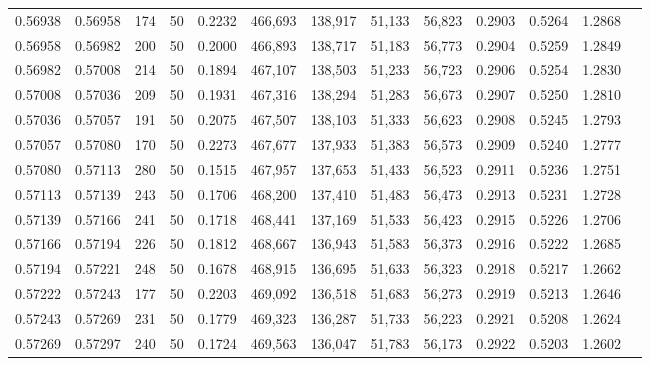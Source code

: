 \begin{tabular}{rrrrrrrrrrrrr}
0.56938 & 0.56958 &   174 &  50 &                                     0.2232 & 466,693 & 138,917 &  51,133 &  56,823 & 0.2903 & 0.5264 & 1.2868 \\
0.56958 & 0.56982 &   200 &  50 &                                     0.2000 & 466,893 & 138,717 &  51,183 &  56,773 & 0.2904 & 0.5259 & 1.2849 \\
0.56982 & 0.57008 &   214 &  50 &                                     0.1894 & 467,107 & 138,503 &  51,233 &  56,723 & 0.2906 & 0.5254 & 1.2830 \\
0.57008 & 0.57036 &   209 &  50 &                                     0.1931 & 467,316 & 138,294 &  51,283 &  56,673 & 0.2907 & 0.5250 & 1.2810 \\
0.57036 & 0.57057 &   191 &  50 &                                     0.2075 & 467,507 & 138,103 &  51,333 &  56,623 & 0.2908 & 0.5245 & 1.2793 \\
0.57057 & 0.57080 &   170 &  50 &                                     0.2273 & 467,677 & 137,933 &  51,383 &  56,573 & 0.2909 & 0.5240 & 1.2777 \\
0.57080 & 0.57113 &   280 &  50 &                                     0.1515 & 467,957 & 137,653 &  51,433 &  56,523 & 0.2911 & 0.5236 & 1.2751 \\
0.57113 & 0.57139 &   243 &  50 &                                     0.1706 & 468,200 & 137,410 &  51,483 &  56,473 & 0.2913 & 0.5231 & 1.2728 \\
0.57139 & 0.57166 &   241 &  50 &                                     0.1718 & 468,441 & 137,169 &  51,533 &  56,423 & 0.2915 & 0.5226 & 1.2706 \\
0.57166 & 0.57194 &   226 &  50 &                                     0.1812 & 468,667 & 136,943 &  51,583 &  56,373 & 0.2916 & 0.5222 & 1.2685 \\
0.57194 & 0.57221 &   248 &  50 &                                     0.1678 & 468,915 & 136,695 &  51,633 &  56,323 & 0.2918 & 0.5217 & 1.2662 \\
0.57222 & 0.57243 &   177 &  50 &                                     0.2203 & 469,092 & 136,518 &  51,683 &  56,273 & 0.2919 & 0.5213 & 1.2646 \\
0.57243 & 0.57269 &   231 &  50 &                                     0.1779 & 469,323 & 136,287 &  51,733 &  56,223 & 0.2921 & 0.5208 & 1.2624 \\
0.57269 & 0.57297 &   240 &  50 &                                     0.1724 & 469,563 & 136,047 &  51,783 &  56,173 & 0.2922 & 0.5203 & 1.2602 \\

\end{tabular}
